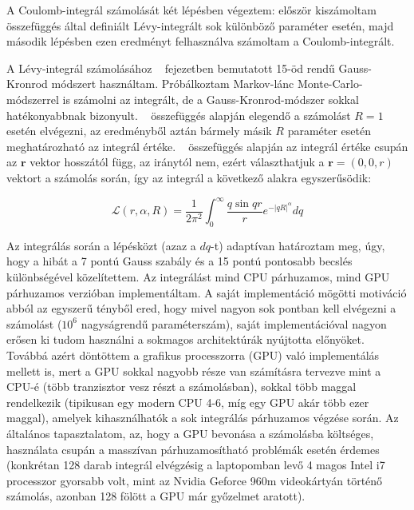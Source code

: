 \documentclass[11pt,a4paper]{article}
\numberwithin{equation}{subsection}
\numberwithin{figure}{section}
\begin{document}
A Coulomb-integrál számolását két lépésben végeztem: először kiszámoltam ~ összefüggés által definiált Lévy-integrált sok különböző paraméter esetén, majd második lépésben ezen eredményt felhasználva számoltam a Coulomb-integrált.

A Lévy-integrál számolásához ~ fejezetben bemutatott 15-öd rendű Gauss-Kronrod módszert használtam. Próbálkoztam Markov-lánc Monte-Carlo-módszerrel is számolni az integrált, de a Gauss-Kronrod-módszer sokkal hatékonyabbnak bizonyult. ~ összefüggés alapján elegendő a számolást $R=1$ esetén elvégezni, az eredményből aztán bármely másik $R$ paraméter esetén meghatározható az integrál értéke. ~ összefüggés alapján az integrál értéke csupán az $\bm{r}$ vektor hosszától függ, az iránytól nem, ezért választhatjuk a $\bm{r}=(0,0,r)$ vektort a számolás során, így az integrál a következő alakra egyszerűsödik:

\begin{equation}
\mathcal{L}(r, \alpha, R) = \frac{1}{2\pi^2}\int_0^\infty \frac{q\sin{qr}}{r}e^{-|qR|^\alpha}dq
\end{equation}

Az integrálás során a lépésközt (azaz a $dq$-t) adaptívan határoztam meg, úgy, hogy a hibát a 7 pontú Gauss szabály és a 15 pontú pontosabb becslés különbségével közelítettem. Az integrálást mind CPU párhuzamos, mind GPU párhuzamos verzióban implementáltam. A saját implementáció mögötti motiváció abból az egyszerű tényből ered, hogy mivel nagyon sok pontban kell elvégezni a számolást ($10^6$ nagyságrendű paraméterszám), saját implementációval nagyon erősen ki tudom használni a sokmagos architektúrák nyújtotta előnyöket. Továbbá azért döntöttem a grafikus processzorra (GPU) való implementálás mellett is, mert a GPU sokkal nagyobb része van számításra tervezve mint a CPU-é (több tranzisztor vesz részt a számolásban), sokkal több maggal rendelkezik (tipikusan egy modern CPU 4-6, míg egy GPU akár több ezer maggal), amelyek kihasználhatók a sok integrálás párhuzamos végzése során. Az általános tapasztalatom, az, hogy a GPU bevonása a számolásba költséges, használata csupán a masszívan párhuzamosítható problémák esetén érdemes (konkrétan 128 darab integrál elvégzésig a laptopomban levő 4 magos Intel i7 processzor gyorsabb volt, mint az Nvidia Geforce 960m videokártyán történő számolás, azonban 128 fölött a GPU már győzelmet aratott).
\end{document}
